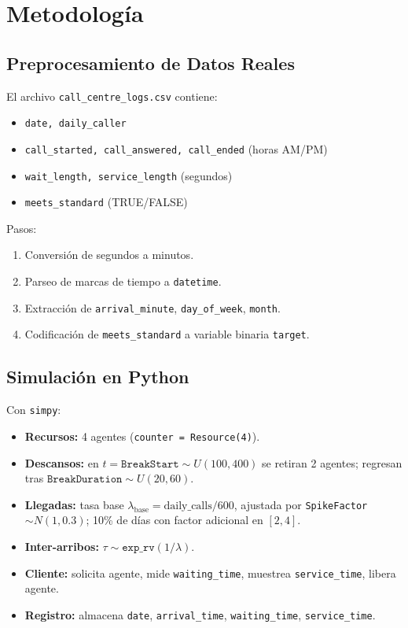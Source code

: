 \documentclass[12pt]{article}
\begin{document}
\newpage
\section{Metodología}

\subsection{Preprocesamiento de Datos Reales}
El archivo \texttt{call\_centre\_logs.csv} contiene:
\begin{itemize}
  \item \texttt{date, daily\_caller}
  \item \texttt{call\_started, call\_answered, call\_ended} (horas AM/PM)
  \item \texttt{wait\_length, service\_length} (segundos)
  \item \texttt{meets\_standard} (TRUE/FALSE)
\end{itemize}
Pasos:
\begin{enumerate}
  \item Conversión de segundos a minutos.
  \item Parseo de marcas de tiempo a \texttt{datetime}.
  \item Extracción de \texttt{arrival\_minute}, \texttt{day\_of\_week}, \texttt{month}.
  \item Codificación de \texttt{meets\_standard} a variable binaria \texttt{target}.
\end{enumerate}

\subsection{Simulación en Python}
Con \texttt{simpy}:
\begin{itemize}
  \item \textbf{Recursos:} 4 agentes (\texttt{counter = Resource(4)}).
  \item \textbf{Descansos:} en $t=\texttt{BreakStart}\sim U(100,400)$ se retiran 2 agentes; regresan tras $\texttt{BreakDuration}\sim U(20,60)$.
  \item \textbf{Llegadas:} tasa base $\lambda_{\text{base}} = \mathrm{daily\_calls}/600$, ajustada por \texttt{SpikeFactor}$\sim N(1,0.3)$; 10\% de días con factor adicional en $[2,4]$.
  \item \textbf{Inter-arribos:} $\tau\sim \texttt{exp\_rv}(1/\lambda)$.
  \item \textbf{Cliente:} solicita agente, mide \texttt{waiting\_time}, muestrea \texttt{service\_time}, libera agente.
  \item \textbf{Registro:} almacena \texttt{date}, \texttt{arrival\_time}, \texttt{waiting\_time}, \texttt{service\_time}.
\end{itemize}
\end{document}
